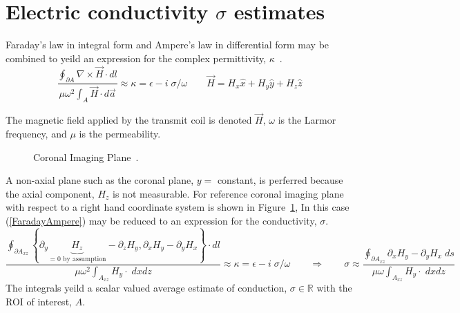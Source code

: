 \documentclass{article}
\newcommand{\eqn}[1]{(\ref{#1})}
\newcommand{\picdir}{pdffig}
\begin{document}
\pagebreak
\section{Electric conductivity $\sigma$ estimates}

Faraday's law in integral form
and Ampere's law in differential form may be combined to yeild an
expression for the complex permittivity, $\kappa$~\cite{katscher2009determination}.
\begin{equation}\label{FaradayAmpere}
  \frac{\oint_{\partial A} \nabla \times \vec{H}  \cdot dl }{
        \mu \omega^2  \int_A \vec{H} \cdot d\vec{a}
       }
   \approx
     \kappa  = \epsilon  - i \; \sigma / \omega
\qquad
  \vec{H} = H_x \hat{x}   
          + H_y \hat{y}   
          + H_z \hat{z}   
\end{equation}

The magnetic field applied by the transmit coil is denoted $\vec{H}$,	
$\omega$ is the Larmor frequency, and $\mu$ is the permeability.
\begin{figure}[h]
\centering{}
\caption{
Coronal Imaging Plane~\cite{katscher2009determination}.
}\label{Fig:ImagingPlane}
\end{figure}
A non-axial plane such as the 
coronal plane, $y=$ constant, is perferred because the axial component,
$H_z$ is not measurable. 
For reference coronal imaging plane with respect to a 
right hand coordinate system is shown in Figure~\ref{Fig:ImagingPlane},
In this case \eqn{FaradayAmpere} may be reduced
 to an expression for the conductivity, $\sigma$.
\begin{equation}
  \frac{\oint_{\partial A_{xz}}
        \left\{
          \partial_y \underbrace{H_z}_{= 0 \text{ by assumption}} - 
          \partial_z             H_y
              , 
           \partial_x H_y - \partial_y H_x
        \right\}  \cdot dl }{
        \mu \omega^2  \int_{A_{xz} } H_y \cdot \; dx dz
       }
   \approx
     \kappa  = \epsilon  - i \; \sigma / \omega
\qquad
\Rightarrow
\qquad
\sigma \approx
  \frac{\oint_{\partial A_{xz}}
           \partial_x H_y - \partial_y H_x
                  \; ds  }{
        \mu \omega  \int_{A_{xz} } H_y \cdot \; dx dz
       }
\end{equation}
The integrals yeild a scalar valued average estimate of conduction, $\sigma \in
\mathbb{R}$ with the ROI of interest, $A$.
\end{document}
